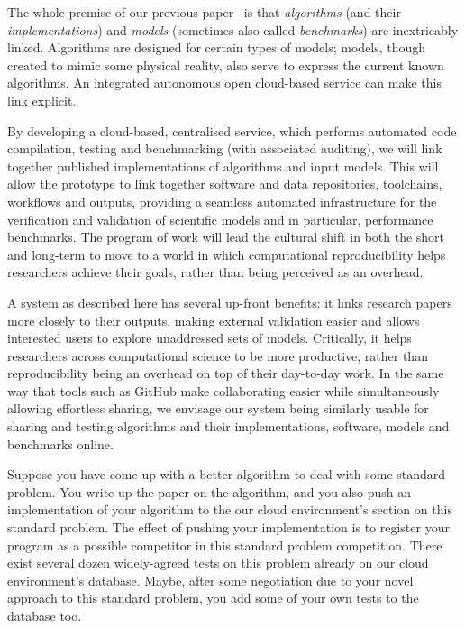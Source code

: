 \documentclass[a4paper,11pt]{article}
\begin{document}
The whole premise of our previous paper~\cite{crick-et-al_recomp2014}
is that {\emph{algorithms}} (and their {\emph{implementations}}) and
{\emph{models}} (sometimes also called {\emph{benchmarks}}) are
inextricably linked. Algorithms are designed for certain types of
models; models, though created to mimic some physical reality, also
serve to express the current known algorithms. An integrated autonomous
open cloud-based service can make this link explicit.

By developing a cloud-based, centralised service, which performs
automated code compilation, testing and benchmarking (with associated
auditing), we will link together published implementations of
algorithms and input models. This will allow the prototype to link
together software and data repositories, toolchains, workflows and
outputs, providing a seamless automated infrastructure for the
verification and validation of scientific models and in particular,
performance benchmarks. The program of work will lead the cultural
shift in both the short and long-term to move to a world in which
computational reproducibility helps researchers achieve their goals,
rather than being perceived as an overhead.

A system as described here has several up-front benefits: it links
research papers more closely to their outputs, making external
validation easier and allows interested users to explore unaddressed
sets of models. Critically, it helps researchers across computational
science to be more productive, rather than reproducibility being an
overhead on top of their day-to-day work. In the same way that tools
such as GitHub make collaborating easier while simultaneously allowing
effortless sharing, we envisage our system being similarly usable for
sharing and testing algorithms and their implementations, software,
models and benchmarks online.

Suppose you have come up with a better algorithm to deal with some
standard problem.  You write up the paper on the algorithm, and you
also push an implementation of your algorithm to the our cloud
environment's section on this standard problem. The effect of pushing
your implementation is to register your program as a possible
competitor in this standard problem competition. There exist several
dozen widely-agreed tests on this problem already on our cloud
environment's database. Maybe, after some negotiation due to your
novel approach to this standard problem, you add some of your own
tests to the database too.
\end{document}
